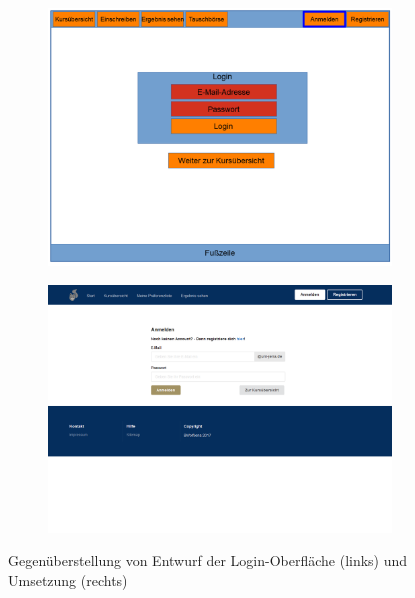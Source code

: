         \begin{figure}
            \centering
            \begin{subfigure}{0.49\textwidth}
                \includegraphics[width=1.0\textwidth]{./implementation/images/MockUpsFrontend/frontendLogin.png}
            \end{subfigure}
            \begin{subfigure}{0.49\textwidth}
                \includegraphics[width=1.0\textwidth]{./implementation/images/login.png}
            \end{subfigure}
            \caption{Gegenüberstellung von Entwurf der Login-Oberfläche (links) und Umsetzung (rechts)}
            \label{fig:comparisonLogin}
        \end{figure}
    
